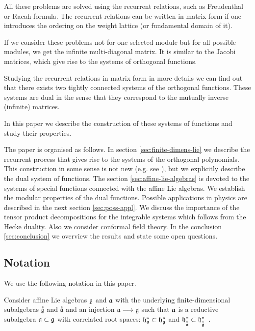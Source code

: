 \documentclass[a4paper,12pt]{article}
\theoremstyle{definition}
\theoremstyle{definition}
\theoremstyle{definition}
\newcommand{\go}{\stackrel{\circ }{\mathfrak{g}}}
\newcommand{\ao}{\stackrel{\circ }{\mathfrak{a}}}
\begin{document}
All these problems are solved using the recurrent relations, such as Freudenthal or Racah formula. 
The recurrent relations can be written in matrix form if one introduces the ordering on the weight lattice (or fundamental domain of it).

If we consider these problems not for one selected module but for all possible modules, we get the infinite multi-diagonal matrix. It is similar to the Jacobi matrices, which give rise to the systems of orthogonal functions.

Studying the recurrent relations in matrix form in more details we can find out that there exists two tightly connected systems of the orthogonal functions. These systems are dual in the sense that they correspond to the mutually inverse (infinite) matrices. 

In this paper we describe the construction of these systems of functions and study their properties. 

The paper is organised as follows. In section \ref{sec:finite-dimens-lie} we describe the recurrent process that gives rise to the systems of the orthogonal polynomials. This construction in some sense is not new (e.g. see \cite{2010arXiv1001}), but we explicitly describe the dual system of functions.  The section \ref{sec:affine-lie-algebras} is devoted to the systems of special functions connected with the affine Lie algebras. We establish the modular properties of the dual functions. Possible applications in physics are described in the next section \ref{sec:poss-appl}. We discuss the importance of the tensor product decompositions for the integrable systems which follows from the Hecke duality. Also we consider conformal field theory.
In the conclusion \ref{sec:conclusion} we overview the results and state some open questions.

\subsection{Notation}
\label{sec:notation}
We use the following notation in this paper.

Consider affine Lie algebras $\frak{g}$ and $\frak{a}$ with the
underlying finite-dimensional subalgebras $\go$ and $%
\ao$ and an injection $\frak{a}\longrightarrow \frak{g%
}$ such that $\frak{a}$ is a reductive subalgebra $\frak{a\subset g}$ with
correlated root spaces: $\frak{h}_{\frak{a}}^{\ast }\subset \frak{h}_{\frak{g%
}}^{\ast }$ and $\frak{h}_{\ao}^{\ast }\subset \frak{h%
}_{\go}^{\ast }$\ .
\end{document}
